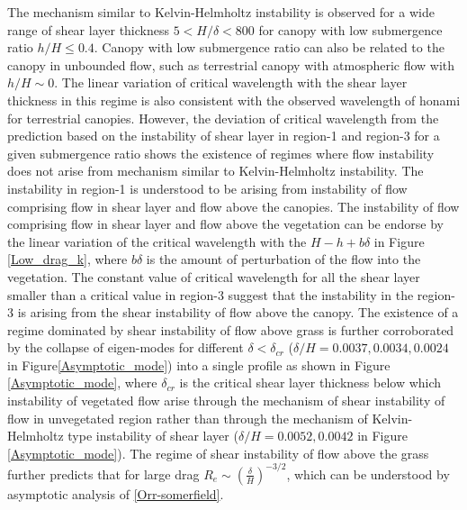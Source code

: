 \documentclass[aps,prl,twocolumn,showpacs,superscriptaddress,groupedaddress,10pt]{revtex4-1}  %
\begin{document}
\newline
The mechanism similar to Kelvin-Helmholtz instability is observed for a wide range of shear layer thickness $5 <H/\delta <800$ for canopy with low submergence ratio $h/H\leq 0.4$.
Canopy with low submergence ratio can also be related to the canopy in unbounded flow, such as terrestrial canopy with atmospheric flow with $h/H\sim 0$. 
The linear variation of critical wavelength with the shear layer thickness in this regime is also consistent with the observed wavelength of honami for terrestrial canopies.
However, the deviation of critical wavelength from the prediction based on the instability of shear layer in region-1 and region-3 for a given submergence ratio shows the existence of 
regimes where flow instability does not arise from mechanism similar to Kelvin-Helmholtz instability. The instability in region-1 is understood to be arising from instability of flow
comprising flow in shear layer and flow above the canopies. The instability of flow comprising flow in shear layer and flow above the vegetation can be endorse by the linear 
variation of the critical wavelength with the $H-h+b\delta$ in Figure \ref{Low_drag_k}, where $b\delta$ is the amount of perturbation of the flow into the vegetation.
\newline
The constant value of critical wavelength for all the shear layer smaller than a critical value in region-3 suggest that the instability 
in the region-3 is arising from the shear instability of flow above the canopy. The existence of a regime dominated by shear instability of flow above grass is further corroborated 
by the collapse of eigen-modes for different $\delta<\delta_{cr}$ ($\delta/H=0.0037,0.0034,0.0024$ in Figure\ref{Asymptotic_mode}) into a single profile as shown in 
Figure \ref{Asymptotic_mode}, where $\delta_{cr}$ is the critical shear layer thickness
below which instability of vegetated flow arise through the mechanism of shear instability of flow in unvegetated region rather than through the mechanism of Kelvin-Helmholtz type 
instability of shear layer ($\delta/H=0.0052,0.0042$ in Figure \ref{Asymptotic_mode}). The regime of shear instability of flow above the 
grass further predicts that for large drag $R_e \sim (\frac{\delta}{H})^{-3/2}$, which can be understood by asymptotic analysis of \eqref{Orr-somerfield}.
\end{document}
